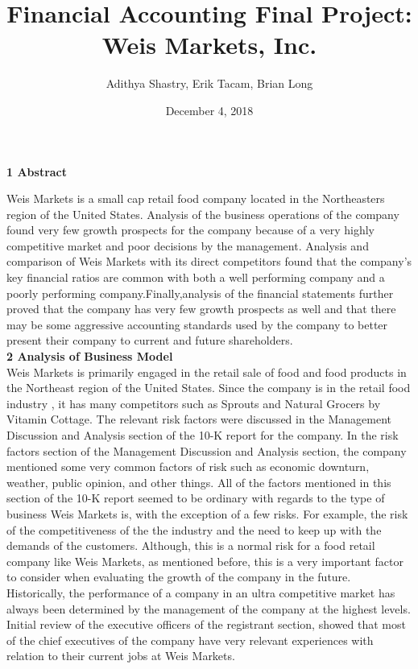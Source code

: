 \documentclass[12pt]{article}
\title{Financial Accounting Final Project:\\Weis Markets, Inc.}
\author{Adithya Shastry, Erik Tacam, Brian Long}
\date{December 4, 2018}
\begin{document}
\maketitle   
\newpage
\newpage
\textbf{1 Abstract}
\\
\begin{doublespacing}
Weis Markets is a small cap retail food company located in the Northeasters region of the United States. Analysis of the business operations of the company found very few growth prospects for the company because of a very highly competitive market and poor decisions by the management. Analysis and comparison of Weis Markets with its direct competitors found that the company's key financial ratios are common with both a well performing company and a poorly performing company.Finally,analysis of the financial statements further proved that the company has very few growth prospects as well and that there may be some aggressive accounting standards used by the company to better present their company to current and future shareholders.
\\

\textbf{2 Analysis of Business Model}
\\
Weis Markets is primarily engaged in the retail sale of food and food products in the Northeast region of the United States. Since the company is in the retail food industry , it has many competitors such as Sprouts and Natural Grocers by Vitamin Cottage. The relevant risk factors were discussed in the Management Discussion and Analysis section of the 10-K report for the company. In the risk factors section of the Management Discussion and Analysis section, the company mentioned some very common factors of risk such as economic downturn, weather, public opinion, and other things. All of the factors mentioned in this section of the 10-K report seemed to be ordinary with regards to the type of business Weis Markets is, with the exception of a few risks. For example, the risk of the competitiveness of the the industry and the need to keep up with the demands of the customers. Although, this is a normal risk for a food retail company like Weis Markets, as mentioned before, this is a very important factor to consider when evaluating the growth of the company in the future. Historically, the performance of a company in an ultra competitive market has always been determined by the management of the company at the highest levels. Initial review of the executive officers of the registrant section, showed that most of the chief executives of the company have very relevant experiences with relation to their current jobs at Weis Markets. 


\end{doublespacing}
\end{document}

